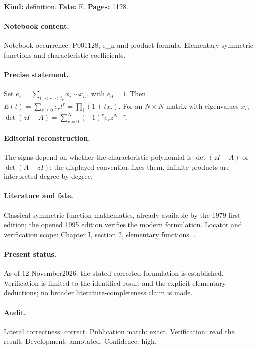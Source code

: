\label{item:1983-605.3}

\noindent\textbf{Kind:} definition. \textbf{Fate:} E. \textbf{Pages:} 1128.\par

\paragraph{Notebook content.} Notebook occurrence: P001128, e_n and product formula. Elementary symmetric functions and characteristic coefficients.

\paragraph{Precise statement.} Set \(e_r=\sum_{i_1<\cdots<i_r}x_{i_1}\cdots x_{i_r}\), with \(e_0=1\). Then \(E(t)=\sum_{r\ge0}e_rt^r=\prod_i(1+tx_i)\). For an \(N\times N\) matrix with eigenvalues \(x_i\), \(\det(zI-A)=\sum_{r=0}^N(-1)^re_rz^{N-r}\).

\paragraph{Editorial reconstruction.} The signs depend on whether the characteristic polynomial is \(\det(zI-A)\) or \(\det(A-zI)\); the displayed convention fixes them. Infinite products are interpreted degree by degree.

\paragraph{Literature and fate.} Classical symmetric-function mathematics, already available by the 1979 first edition; the opened 1995 edition verifies the modern formulation. Locator and verification scope: Chapter I, section 2, elementary functions. \cite{macdonald1995symmetric}.

\paragraph{Present status.} As of 12 November2026: the stated corrected formulation is established. Verification is limited to the identified result and the explicit elementary deductions; no broader literature-completeness claim is made.

\paragraph{Audit.} Literal correctness: correct. Publication match: exact. Verification: read the result. Development: annotated. Confidence: high.

